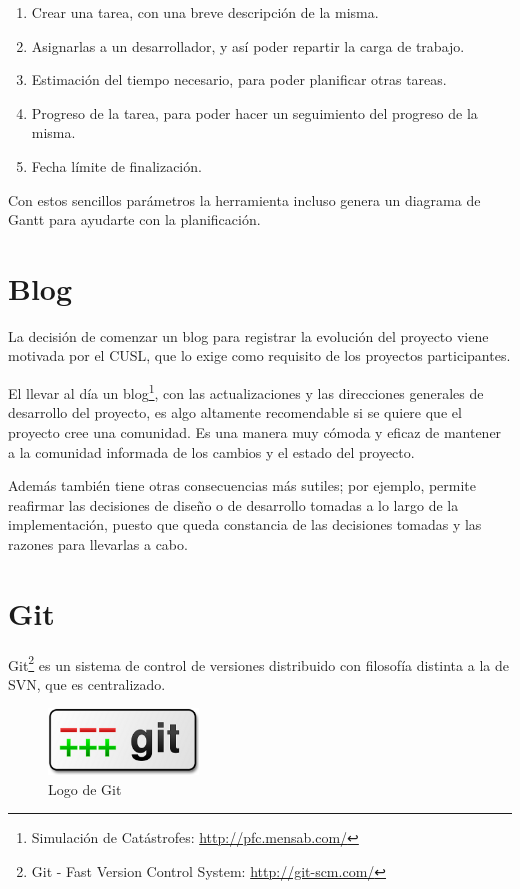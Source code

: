 \begin{enumerate}
 \item Crear una tarea, con una breve descripción de la misma.
 \item Asignarlas a un desarrollador, y así poder repartir la carga de trabajo.
 \item Estimación del tiempo necesario, para poder planificar otras tareas.
 \item Progreso de la tarea, para poder hacer un seguimiento del progreso de la
 misma.
 \item Fecha límite de finalización.
\end{enumerate}

Con estos sencillos parámetros la herramienta incluso genera un diagrama de
Gantt para ayudarte con la planificación.


\section*{Blog}

La decisión de comenzar un blog para registrar la evolución del proyecto viene
motivada por el CUSL, que lo exige como requisito de los proyectos
participantes.

El llevar al día un blog\footnote{Simulación de Catástrofes:
\url{http://pfc.mensab.com/}}, con las actualizaciones y las direcciones
generales de desarrollo del proyecto, es algo altamente recomendable si se
quiere que el proyecto cree una comunidad. Es una manera muy cómoda y eficaz de
mantener a la comunidad informada de los cambios y el estado del proyecto.

Además también tiene otras consecuencias más sutiles; por ejemplo, permite
reafirmar las decisiones de diseño o de desarrollo tomadas a lo largo de la
implementación, puesto que queda constancia de las decisiones tomadas y las
razones para llevarlas a cabo.

\section*{Git}

Git\footnote{Git - Fast Version Control System: \url{http://git-scm.com/}} es
un sistema de control de versiones distribuido con filosofía distinta a la de
SVN, que es centralizado.

\begin{figure}[H]
 \centering
 \includegraphics[width=40mm]{figuras/cap5/git.png}
 \caption{Logo de Git}
\end{figure}

